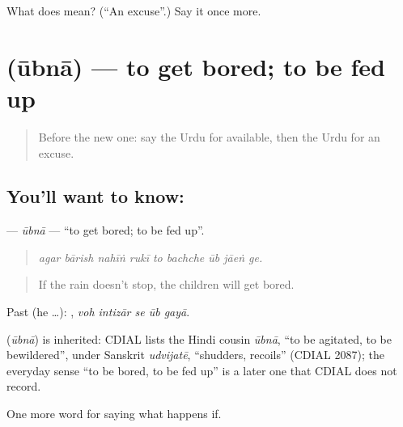 \begin{tcolorbox}[breakable,colback=teal!4,colframe=teal!35!black,title={Before you move on}]
What does  mean? (\textquotedblleft{}An excuse\textquotedblright{}.) Say it once more.
\end{tcolorbox}
\section[\texorpdfstring{\ur{اوبنا} (ūbnā)}{اوبنا (ūbnā)}]{ (ūbnā) — to get bored; to be fed up}

\label{lesson:UR-C527-ubna}



\begin{quote}
Before the new one: say the Urdu for available, then the Urdu for an excuse.
\end{quote}

\subsection*{You'll want to know: }
\textbf{} — \emph{ūbnā} — \textquotedblleft{}to get bored; to be fed up\textquotedblright{}.

\begin{quote}
        
\end{quote}

\begin{quote}
\emph{agar bārish nahīṅ rukī to bachche ūb jāeṅ ge.}
\end{quote}

\begin{quote}
If the rain doesn't stop, the children will get bored.
\end{quote}

Past (he …):     , \emph{voh intizār se ūb gayā}.

\begin{cousinweb}
\textbf{} (\emph{ūbnā}) is inherited: CDIAL lists the Hindi cousin \emph{ūbnā}, \textquotedblleft{}to be agitated, to be bewildered\textquotedblright{}, under Sanskrit \emph{udvijatē}, \textquotedblleft{}shudders, recoils\textquotedblright{} (CDIAL 2087); the everyday sense \textquotedblleft{}to be bored, to be fed up\textquotedblright{} is a later one that CDIAL does not record.
\end{cousinweb}

\begin{grammarlens}[title={What you've built}]
One more word for saying what happens if.
\end{grammarlens}

